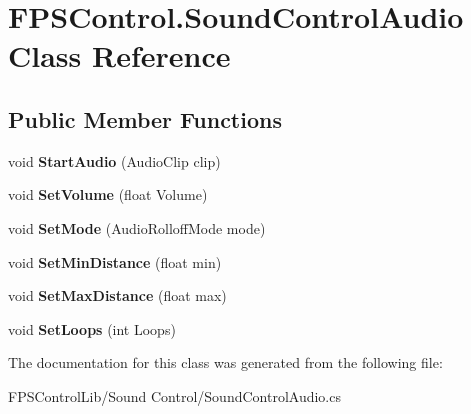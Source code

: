 \hypertarget{class_f_p_s_control_1_1_sound_control_audio}{\section{F\-P\-S\-Control.\-Sound\-Control\-Audio Class Reference}
\label{class_f_p_s_control_1_1_sound_control_audio}
}
\subsection*{Public Member Functions}
\begin{DoxyCompactItemize}
\item 
\hypertarget{class_f_p_s_control_1_1_sound_control_audio_a31440e056bd9893cd81c11731b6dd472}{void {\bfseries Start\-Audio} (Audio\-Clip clip)}\label{class_f_p_s_control_1_1_sound_control_audio_a31440e056bd9893cd81c11731b6dd472}

\item 
\hypertarget{class_f_p_s_control_1_1_sound_control_audio_a4b39ec69e008010a58ac9048fea52b65}{void {\bfseries Set\-Volume} (float Volume)}\label{class_f_p_s_control_1_1_sound_control_audio_a4b39ec69e008010a58ac9048fea52b65}

\item 
\hypertarget{class_f_p_s_control_1_1_sound_control_audio_a4fe01f35896278a4178d122143a012e5}{void {\bfseries Set\-Mode} (Audio\-Rolloff\-Mode mode)}\label{class_f_p_s_control_1_1_sound_control_audio_a4fe01f35896278a4178d122143a012e5}

\item 
\hypertarget{class_f_p_s_control_1_1_sound_control_audio_a51c8197e8f672b6ee5416b2631f6494b}{void {\bfseries Set\-Min\-Distance} (float min)}\label{class_f_p_s_control_1_1_sound_control_audio_a51c8197e8f672b6ee5416b2631f6494b}

\item 
\hypertarget{class_f_p_s_control_1_1_sound_control_audio_ac95d61e8a93c2ec57d44c9f52f448e13}{void {\bfseries Set\-Max\-Distance} (float max)}\label{class_f_p_s_control_1_1_sound_control_audio_ac95d61e8a93c2ec57d44c9f52f448e13}

\item 
\hypertarget{class_f_p_s_control_1_1_sound_control_audio_aa3739e6681738ba228e46a843a885de8}{void {\bfseries Set\-Loops} (int Loops)}\label{class_f_p_s_control_1_1_sound_control_audio_aa3739e6681738ba228e46a843a885de8}

\end{DoxyCompactItemize}


The documentation for this class was generated from the following file\-:\begin{DoxyCompactItemize}
\item 
F\-P\-S\-Control\-Lib/\-Sound Control/Sound\-Control\-Audio.\-cs\end{DoxyCompactItemize}

